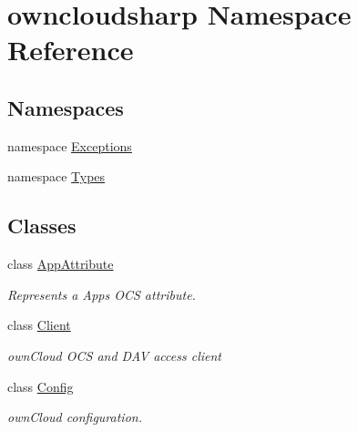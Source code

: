 \hypertarget{namespaceowncloudsharp}{}\section{owncloudsharp Namespace Reference}
\label{namespaceowncloudsharp}
\subsection*{Namespaces}
\begin{DoxyCompactItemize}
\item 
namespace \hyperlink{namespaceowncloudsharp_1_1_exceptions}{Exceptions}
\item 
namespace \hyperlink{namespaceowncloudsharp_1_1_types}{Types}
\end{DoxyCompactItemize}
\subsection*{Classes}
\begin{DoxyCompactItemize}
\item 
class \hyperlink{classowncloudsharp_1_1_app_attribute}{App\+Attribute}
\begin{DoxyCompactList}\small\item\em Represents a Apps O\+C\+S attribute. \end{DoxyCompactList}\item 
class \hyperlink{classowncloudsharp_1_1_client}{Client}
\begin{DoxyCompactList}\small\item\em own\+Cloud O\+C\+S and D\+A\+V access client \end{DoxyCompactList}\item 
class \hyperlink{classowncloudsharp_1_1_config}{Config}
\begin{DoxyCompactList}\small\item\em own\+Cloud configuration. \end{DoxyCompactList}\end{DoxyCompactItemize}
